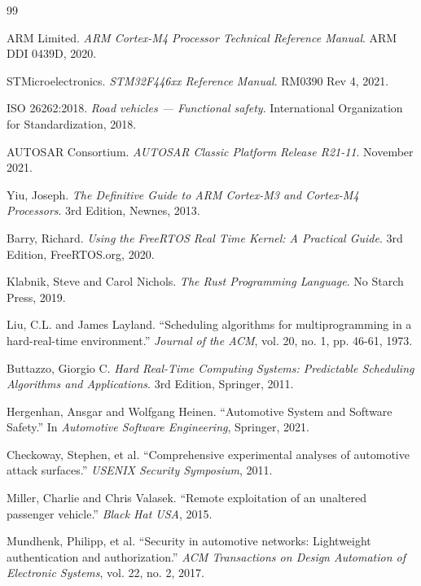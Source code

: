 
\begin{thebibliography}{99}

ARM Limited.
\textit{ARM Cortex-M4 Processor Technical Reference Manual}.
ARM DDI 0439D, 2020.

STMicroelectronics.
\textit{STM32F446xx Reference Manual}.
RM0390 Rev 4, 2021.

ISO 26262:2018.
\textit{Road vehicles — Functional safety}.
International Organization for Standardization, 2018.

AUTOSAR Consortium.
\textit{AUTOSAR Classic Platform Release R21-11}.
November 2021.

Yiu, Joseph.
\textit{The Definitive Guide to ARM Cortex-M3 and Cortex-M4 Processors}.
3rd Edition, Newnes, 2013.

Barry, Richard.
\textit{Using the FreeRTOS Real Time Kernel: A Practical Guide}.
3rd Edition, FreeRTOS.org, 2020.

Klabnik, Steve and Carol Nichols.
\textit{The Rust Programming Language}.
No Starch Press, 2019.

Liu, C.L. and James Layland.
``Scheduling algorithms for multiprogramming in a hard-real-time environment.''
\textit{Journal of the ACM}, vol. 20, no. 1, pp. 46-61, 1973.

Buttazzo, Giorgio C.
\textit{Hard Real-Time Computing Systems: Predictable Scheduling Algorithms and Applications}.
3rd Edition, Springer, 2011.

Hergenhan, Ansgar and Wolfgang Heinen.
``Automotive System and Software Safety.''
In \textit{Automotive Software Engineering}, Springer, 2021.

Checkoway, Stephen, et al.
``Comprehensive experimental analyses of automotive attack surfaces.''
\textit{USENIX Security Symposium}, 2011.

Miller, Charlie and Chris Valasek.
``Remote exploitation of an unaltered passenger vehicle.''
\textit{Black Hat USA}, 2015.

Mundhenk, Philipp, et al.
``Security in automotive networks: Lightweight authentication and authorization.''
\textit{ACM Transactions on Design Automation of Electronic Systems}, vol. 22, no. 2, 2017.


\end{thebibliography}
